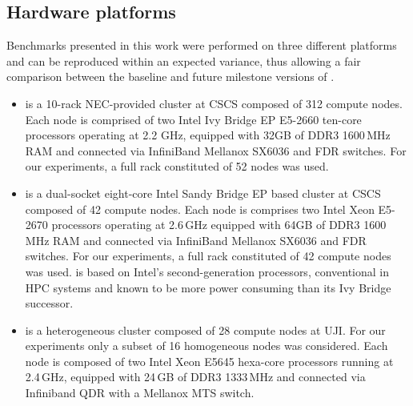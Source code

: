 \subsection{Hardware platforms}
\label{subsec:3.1}

Benchmarks presented  in this work  were performed on  three different
platforms  and can  be reproduced  within an  expected  variance, thus
allowing a  fair comparison between the baseline  and future milestone
versions of \cosmoart.

\begin{itemize}
\item \monch is a 10-rack NEC-provided clus\-ter at CSCS composed
  of 312 compute  nodes. %
  Each node is comprised of two Intel Ivy Bridge EP  E5-2660 ten-core processors
  operating at  2.2 GHz, equipped with 32GB of DDR3 1600\,MHz  RAM and connected  via InfiniBand Mellanox  SX6036 and FDR switches. For our  experiments, 
  a full rack constituted of 52 nodes was used. %

\item \pilat is a dual-socket eight-core Intel Sandy
  Bridge EP based cluster at  CSCS composed of 42 compute nodes. %
  Each node is comprises two Intel Xeon E5-2670 processors operating  at 2.6\,GHz equipped with 64GB of DDR3 1600\,MHz RAM and connected  via InfiniBand Mellanox SX6036 and FDR switches. 
  For our  experiments, a full rack constituted of 42 compute nodes
  was used. \pilat  is based  on  Intel's second-generation
  processors, conventional in  HPC systems and known to  be more power
  consuming than its Ivy Bridge successor.\\

\item \tinto is  a heterogeneous cluster composed of
  28 compute nodes at UJI. For our  experiments only a subset of 16 homogeneous nodes was considered. Each node is composed of two Intel Xeon E5645 hexa-core processors 
  running at 2.4\,GHz, equipped with 24\,GB  of DDR3 1333\,MHz and connected via Infiniband QDR with a Mellanox MTS switch. 

\end{itemize}

